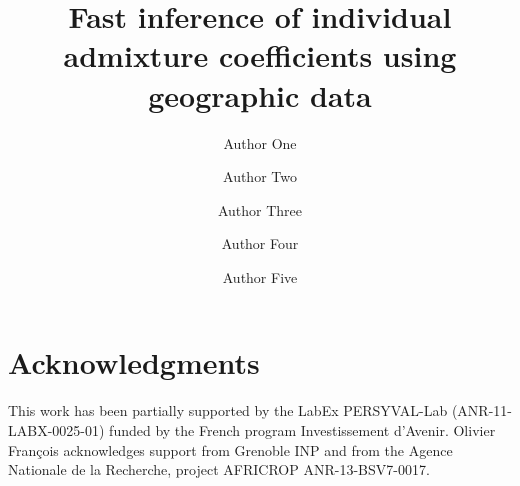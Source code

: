 \documentclass[12pt,lineno]{gsajnl}
\title{Fast inference of individual admixture coefficients using geographic data}
\author[$\ast$,1]{Author One}
\author[$\dagger$]{Author Two}
\author[$\ddagger$]{Author Three}
\author[$\S$]{Author Four}
\author[$\ast\ast$]{Author Five}
\affil[$\ast$]{Author one affiliation}
\affil[$\dagger$]{Author two affiliation}
\affil[$\ddagger$]{Author three affiliation}
\affil[$\S$]{Author four affiliation}
\affil[$\ast\ast$]{Author five affiliation}
\begin{document}
\baselineskip 0.8cm

\maketitle
\thispagestyle{firststyle}
\marginmark
\firstpagefootnote
{}
\vspace{-11pt}%






\section*{Acknowledgments} 

This work has been partially supported by the LabEx PERSYVAL-Lab (ANR-11-LABX-0025-01) funded by the French program
Investissement d\rq{}Avenir. Olivier Fran\c cois acknowledges support from Grenoble INP and from the Agence Nationale de la Recherche, project AFRICROP ANR-13-BSV7-0017.

\newpage 



\end{document}
